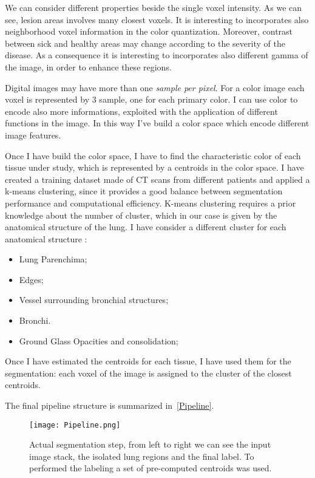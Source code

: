 \documentclass{standalone}
\begin{document}
	We can consider different properties beside the single voxel intensity. As we can see, lesion areas involves many closest voxels. It is interesting to incorporates also neighborhood voxel information in the color quantization. Moreover, contrast between sick and healthy areas may change according to the severity of the disease. As a consequence it is interesting to incorporates also different gamma of the image, in order to enhance these regions.
	
	Digital images may have more than one \textit{sample per pixel}. For a color image each voxel is represented by 3 sample, one for each primary color. I can use color to encode also more informations, exploited with the application of different functions in the image. In this way I've build a color space which encode different image features.
	
	Once I have build the color space, I have to find the characteristic color of each tissue under study, which is represented by a centroids in the color space. I have created a training dataset made of CT scans from different patients and applied a  k-means clustering, since it provides a good balance between segmentation performance and computational efficiency. K-means clustering requires a prior knowledge about the number of cluster, which in our case is given by the anatomical structure of the lung. I have consider a different cluster for each anatomical structure : 
		\begin{itemize}
		\item Lung Parenchima; 
		
		\item  Edges;
		
		\item Vessel surrounding bronchial structures;
		
		\item Bronchi.
		
		\item  Ground Glass Opacities and consolidation;
		
	\end{itemize}
		
	Once I have estimated the centroids for each tissue, I have used them for the  segmentation: each voxel of the image  is assigned  to the cluster of the closest centroids.
	
	The final pipeline structure is summarized in \figurename\,\ref{Pipeline}.
	
	\begin{figure}[h!]
		\centering
		\texttt{[image: Pipeline.png]}
		\caption{Actual segmentation step, from left to right we can see the input image stack, the isolated lung regions and the final label. To performed the labeling a set of pre-computed centroids was used.}\label{fig:Pipeline}
	\end{figure}
\end{document}
